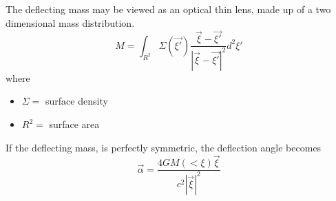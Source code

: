 \documentclass[a4paper]{IEEEtran}
\begin{document}
The deflecting mass may be viewed as an optical thin lens, made up
of a two dimensional mass distribution.
\begin{equation}
    M = \int_{R^2} \Sigma(\vec{\xi '}) 
        \frac{\vec{\xi} - \vec{\xi '} }{|\vec{\xi} - \vec{\xi '}|^2} d^2 \xi '
\end{equation}
where
\begin{itemize}
    \item $\Sigma = $ surface density
    \item $R^2 = $ surface area
\end{itemize}
If the deflecting mass, is perfectly symmetric, the deflection angle becomes
\begin{equation}
    \vec{\alpha} = \frac{4GM(<\xi)\vec{\xi}}{c^2|\vec{\xi}|^2}
\end{equation}
\end{document}
